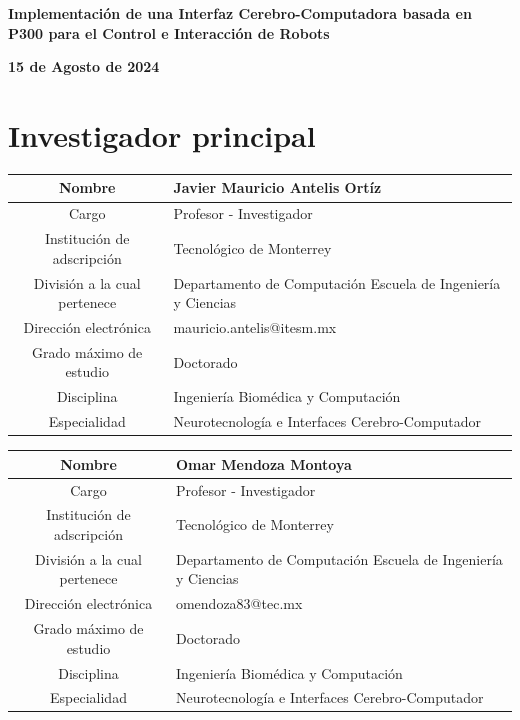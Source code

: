 \documentclass[12pt]{article}
\begin{document}
\begin{flushleft}
    \textbf{\Large Implementación de una Interfaz Cerebro-Computadora basada en P300 para el Control e Interacción de Robots}
    \par
    \textbf{15 de Agosto de 2024}
\end{flushleft}

\section{Investigador principal}

\begin{table}[h!]
    \centering
    \begin{tabular}{|c|p{7cm}|} \hline
        Nombre & Javier Mauricio Antelis Ortíz \\ \hline
        Cargo & Profesor - Investigador \\ \hline
        Institución de adscripción & Tecnológico de Monterrey \\ \hline
        División a la cual pertenece & Departamento de Computación \newline Escuela de Ingeniería y Ciencias \\ \hline
        Dirección electrónica & mauricio.antelis@itesm.mx \\ \hline
        Grado máximo de estudio & Doctorado \\ \hline
        Disciplina & Ingeniería Biomédica y Computación \\ \hline
        Especialidad & Neurotecnología e Interfaces Cerebro-Computador \\ \hline
    \end{tabular}
\end{table}

\begin{table}[h!]
    \centering
    \begin{tabular}{|c|p{7cm}|} \hline
        Nombre & Omar Mendoza Montoya \\ \hline
        Cargo & Profesor - Investigador \\ \hline
        Institución de adscripción & Tecnológico de Monterrey \\ \hline
        División a la cual pertenece & Departamento de Computación \newline Escuela de Ingeniería y Ciencias \\ \hline
        Dirección electrónica & omendoza83@tec.mx \\ \hline
        Grado máximo de estudio & Doctorado \\ \hline
        Disciplina & Ingeniería Biomédica y Computación \\ \hline
        Especialidad & Neurotecnología e Interfaces Cerebro-Computador \\ \hline
    \end{tabular}
\end{table}
\end{document}
